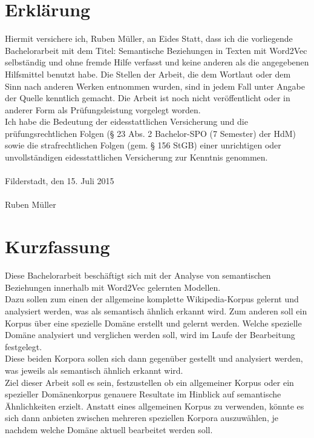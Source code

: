 \documentclass[12pt,a4paper]{report}
\begin{document}
\newpage
\chapter*{Erklärung}
Hiermit versichere ich, Ruben Müller, an Eides Statt, dass ich die vorliegende
Bachelorarbeit mit dem Titel: \glqq Semantische Beziehungen in Texten mit Word2Vec\grqq{} selbständig und ohne fremde Hilfe verfasst und keine anderen als die angegebenen
Hilfsmittel benutzt habe. Die Stellen der Arbeit, die dem Wortlaut oder dem Sinn nach anderen
Werken entnommen wurden, sind in jedem Fall unter Angabe der Quelle kenntlich gemacht. Die
Arbeit ist noch nicht veröffentlicht oder in anderer Form als Prüfungsleistung vorgelegt worden.\\
Ich habe die Bedeutung der eidesstattlichen Versicherung und die prüfungsrechtlichen Folgen (§ 23 Abs. 2 Bachelor-SPO (7 Semester) der HdM) sowie die strafrechtlichen Folgen (gem. § 156 StGB) einer unrichtigen oder
unvollständigen eidesstattlichen Versicherung zur Kenntnis genommen.\\
\vspace{1em}\\
Filderstadt, den 15. Juli 2015\\
\vspace{5em}\\
Ruben Müller


\newpage
\chapter*{Kurzfassung}
Diese Bachelorarbeit beschäftigt sich mit der Analyse von semantischen Beziehungen innerhalb mit Word2Vec gelernten Modellen.
\\Dazu sollen zum einen der allgemeine komplette Wikipedia-Korpus gelernt und analysiert werden, was als semantisch ähnlich erkannt wird. Zum anderen soll ein Korpus über eine spezielle Domäne erstellt und gelernt werden. Welche spezielle Domäne analysiert und verglichen werden soll, wird im Laufe der Bearbeitung festgelegt.
\\Diese beiden Korpora sollen sich dann gegenüber gestellt und analysiert werden, was jeweils als semantisch ähnlich erkannt wird. 
\\Ziel dieser Arbeit soll es sein, festzustellen ob ein allgemeiner Korpus oder ein spezieller Domänenkorpus genauere Resultate im Hinblick auf semantische Ähnlichkeiten erzielt. Anstatt eines allgemeinen Korpus zu verwenden, könnte es sich dann anbieten zwischen mehreren speziellen Korpora auszuwählen, je nachdem welche Domäne aktuell bearbeitet werden soll.
\newpage
\end{document}
